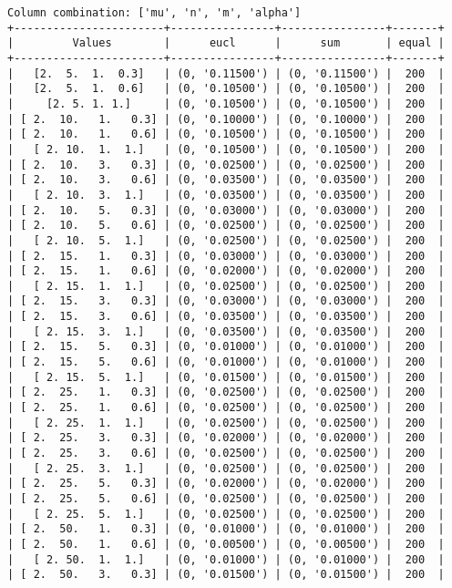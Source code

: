 \documentclass{article}
\begin{document}
\begin{verbatim}
Column combination: ['mu', 'n', 'm', 'alpha']
+-----------------------+----------------+----------------+-------+
|         Values        |      eucl      |      sum       | equal |
+-----------------------+----------------+----------------+-------+
|   [2.  5.  1.  0.3]   | (0, '0.11500') | (0, '0.11500') |  200  |
|   [2.  5.  1.  0.6]   | (0, '0.10500') | (0, '0.10500') |  200  |
|     [2. 5. 1. 1.]     | (0, '0.10500') | (0, '0.10500') |  200  |
| [ 2.  10.   1.   0.3] | (0, '0.10000') | (0, '0.10000') |  200  |
| [ 2.  10.   1.   0.6] | (0, '0.10500') | (0, '0.10500') |  200  |
|   [ 2. 10.  1.  1.]   | (0, '0.10500') | (0, '0.10500') |  200  |
| [ 2.  10.   3.   0.3] | (0, '0.02500') | (0, '0.02500') |  200  |
| [ 2.  10.   3.   0.6] | (0, '0.03500') | (0, '0.03500') |  200  |
|   [ 2. 10.  3.  1.]   | (0, '0.03500') | (0, '0.03500') |  200  |
| [ 2.  10.   5.   0.3] | (0, '0.03000') | (0, '0.03000') |  200  |
| [ 2.  10.   5.   0.6] | (0, '0.02500') | (0, '0.02500') |  200  |
|   [ 2. 10.  5.  1.]   | (0, '0.02500') | (0, '0.02500') |  200  |
| [ 2.  15.   1.   0.3] | (0, '0.03000') | (0, '0.03000') |  200  |
| [ 2.  15.   1.   0.6] | (0, '0.02000') | (0, '0.02000') |  200  |
|   [ 2. 15.  1.  1.]   | (0, '0.02500') | (0, '0.02500') |  200  |
| [ 2.  15.   3.   0.3] | (0, '0.03000') | (0, '0.03000') |  200  |
| [ 2.  15.   3.   0.6] | (0, '0.03500') | (0, '0.03500') |  200  |
|   [ 2. 15.  3.  1.]   | (0, '0.03500') | (0, '0.03500') |  200  |
| [ 2.  15.   5.   0.3] | (0, '0.01000') | (0, '0.01000') |  200  |
| [ 2.  15.   5.   0.6] | (0, '0.01000') | (0, '0.01000') |  200  |
|   [ 2. 15.  5.  1.]   | (0, '0.01500') | (0, '0.01500') |  200  |
| [ 2.  25.   1.   0.3] | (0, '0.02500') | (0, '0.02500') |  200  |
| [ 2.  25.   1.   0.6] | (0, '0.02500') | (0, '0.02500') |  200  |
|   [ 2. 25.  1.  1.]   | (0, '0.02500') | (0, '0.02500') |  200  |
| [ 2.  25.   3.   0.3] | (0, '0.02000') | (0, '0.02000') |  200  |
| [ 2.  25.   3.   0.6] | (0, '0.02500') | (0, '0.02500') |  200  |
|   [ 2. 25.  3.  1.]   | (0, '0.02500') | (0, '0.02500') |  200  |
| [ 2.  25.   5.   0.3] | (0, '0.02000') | (0, '0.02000') |  200  |
| [ 2.  25.   5.   0.6] | (0, '0.02500') | (0, '0.02500') |  200  |
|   [ 2. 25.  5.  1.]   | (0, '0.02500') | (0, '0.02500') |  200  |
| [ 2.  50.   1.   0.3] | (0, '0.01000') | (0, '0.01000') |  200  |
| [ 2.  50.   1.   0.6] | (0, '0.00500') | (0, '0.00500') |  200  |
|   [ 2. 50.  1.  1.]   | (0, '0.01000') | (0, '0.01000') |  200  |
| [ 2.  50.   3.   0.3] | (0, '0.01500') | (0, '0.01500') |  200  |

\end{verbatim}
\end{document}
